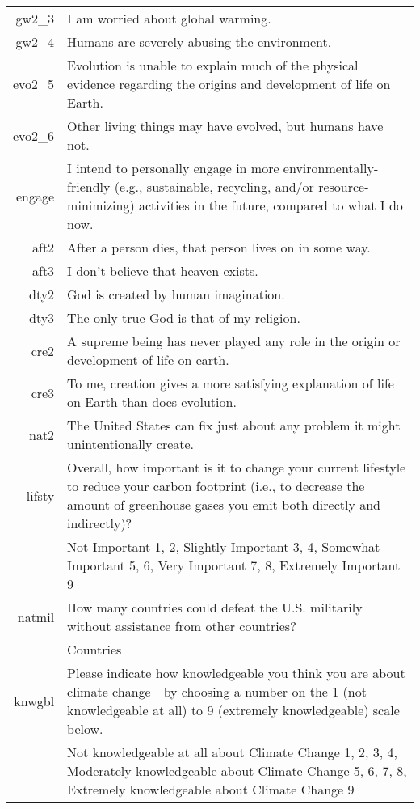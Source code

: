 \begin{longtabu}{rX}
gw2_3 & I am worried about global warming. \\

gw2_4 & Humans are severely abusing the environment. \\

evo2_5 & Evolution is unable to explain much of the physical evidence regarding the origins and development of life on Earth. \\

evo2_6 & Other living things may have evolved, but humans have not. \\

engage & I intend to personally engage in more environmentally-friendly (e.g., sustainable, recycling, and/or resource-minimizing) activities in the future, compared to what I do now. \\

aft2 & After a person dies, that person lives on in some way. \\

aft3 & I don't believe that heaven exists. \\

dty2 & God is created by human imagination. \\

dty3 & The only true God is that of my religion. \\

cre2 & A supreme being has never played any role in the origin or development of life on earth. \\

cre3 & To me, creation gives a more satisfying explanation of life on Earth than does evolution. \\

nat2 & The United States can fix just about any problem it might unintentionally create. \\

lifsty & Overall, how important is it to change your current lifestyle to reduce your carbon footprint (i.e., to decrease the amount of greenhouse gases you emit both directly and indirectly)? \\
 & Not Important 1, 2, Slightly Important 3, 4, Somewhat Important 5, 6, Very Important 7, 8, Extremely Important 9 \\

natmil & How many countries could defeat the U.S. militarily without assistance from other countries? \\
 & \underline{\hspace{3cm}} Countries \\

knwgbl & Please indicate how knowledgeable you think you are about climate
change—by choosing a number on the 1 (not knowledgeable at all) to 9 (extremely
knowledgeable) scale below. \\
 & Not knowledgeable at all about Climate Change 1, 2, 3, 4, Moderately
 knowledgeable about Climate Change 5, 6, 7, 8, Extremely knowledgeable about
 Climate Change 9 \\
\end{longtabu}
